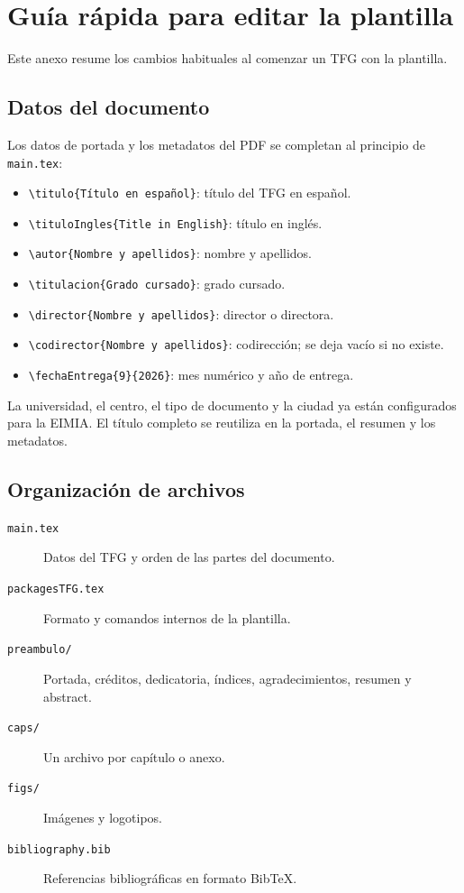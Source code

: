 \chapter{Guía rápida para editar la plantilla}
\label{cap:anexo-guia}

Este anexo resume los cambios habituales al comenzar un TFG con la plantilla.

\section{Datos del documento}
\label{sec:datos-documento}

Los datos de portada y los metadatos del PDF se completan al principio de
\texttt{main.tex}:

\begin{itemize}
    \item \texttt{\textbackslash titulo\{Título en español\}}: título del TFG en español.
    \item \texttt{\textbackslash tituloIngles\{Title in English\}}: título en inglés.
    \item \texttt{\textbackslash autor\{Nombre y apellidos\}}: nombre y apellidos.
    \item \texttt{\textbackslash titulacion\{Grado cursado\}}: grado cursado.
    \item \texttt{\textbackslash director\{Nombre y apellidos\}}: director o directora.
    \item \texttt{\textbackslash codirector\{Nombre y apellidos\}}: codirección; se deja vacío si no existe.
    \item \texttt{\textbackslash fechaEntrega\{9\}\{2026\}}: mes numérico y año de entrega.
\end{itemize}

La universidad, el centro, el tipo de documento y la ciudad ya están
configurados para la EIMIA. El título completo se reutiliza en la portada, el
resumen y los metadatos.

\section{Organización de archivos}
\label{sec:organizacion-archivos}

\begin{description}
    \item[\texttt{main.tex}] Datos del TFG y orden de las partes del documento.
    \item[\texttt{packagesTFG.tex}] Formato y comandos internos de la plantilla.
    \item[\texttt{preambulo/}] Portada, créditos, dedicatoria, índices, agradecimientos, resumen y abstract.
    \item[\texttt{caps/}] Un archivo por capítulo o anexo.
    \item[\texttt{figs/}] Imágenes y logotipos.
    \item[\texttt{bibliography.bib}] Referencias bibliográficas en formato BibTeX.
\end{description}

